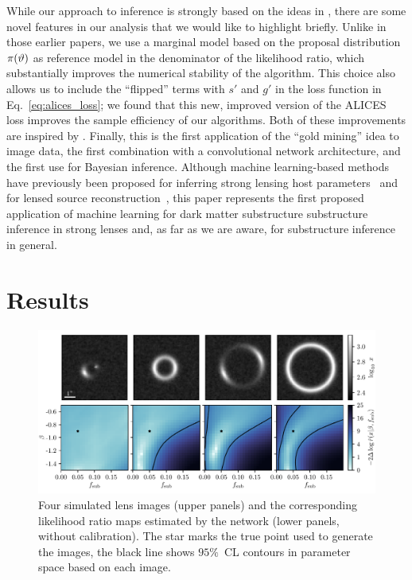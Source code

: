 \documentclass[twocolumn]{aastex62}
\begin{document}
\bigskip
While our approach to inference is strongly based on the ideas in \citet{1805.00013, 1805.00020, 1805.12244, Stoye:2018ovl}, there are some novel features in our analysis that we would like to highlight briefly. Unlike in those earlier papers, we use a marginal model based on the proposal distribution $\pi(\vartheta)$ as reference model in the denominator of the likelihood ratio, which substantially improves the numerical stability of the algorithm. This choice also allows us to include the ``flipped'' terms with $s'$ and $g'$ in the loss function in Eq.~\eqref{eq:alices_loss}; we found that this new, improved version of the ALICES loss improves the sample efficiency of our algorithms. Both of these improvements are inspired by \citet{Hermans:2019ioj}. Finally, this is the first application of the ``gold mining'' idea to image data, the first combination with a convolutional network architecture, and the first use for Bayesian inference. Although machine learning-based methods have previously been proposed for inferring strong lensing host parameters~\citep{1708.08842,1808.00011,1708.08843} and for lensed source reconstruction~\citep{1901.01359}, this paper represents the first proposed application of machine learning for dark matter substructure substructure inference in strong lenses and, as far as we are aware, for substructure inference in general.

\section{Results}
\label{sec:results}

\begin{figure}
\centering
\includegraphics[width=1.\textwidth]{figures/individual_lens_predictions}
\caption{Four simulated lens images (upper panels) and the corresponding likelihood ratio maps estimated by the network (lower panels, without calibration). The star marks the true point used to generate the images, the black line shows $95 \%$~CL contours in parameter space based on each image.}
\label{fig:individual_predictions}
\end{figure}
\end{document}
